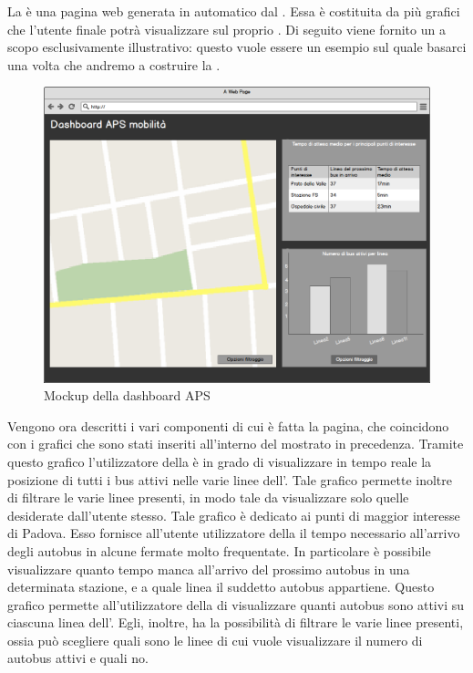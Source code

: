 	La  è una pagina web generata in automatico dal  . Essa è costituita da più grafici che l'utente finale potrà visualizzare sul proprio . Di seguito viene fornito un  a scopo esclusivamente illustrativo: questo vuole essere un esempio sul quale basarci una volta che andremo a costruire la .
	\begin{figure}[H]\centering
        \includegraphics[width=\textwidth]{SpecificaTecnica/Pics/DashboardMockup}
        \caption{Mockup della dashboard APS}
    \end{figure}
    Vengono ora descritti i vari componenti di cui è fatta la pagina, che coincidono con i grafici che sono stati inseriti all'interno del  mostrato in precedenza.
    		Tramite questo grafico l'utilizzatore della  è in grado di visualizzare in tempo reale la posizione di tutti i bus attivi nelle varie linee dell'. Tale grafico permette inoltre di filtrare le varie linee presenti, in modo tale da visualizzare solo quelle desiderate dall'utente stesso.
    		Tale grafico è dedicato ai punti di maggior interesse di Padova. Esso fornisce all'utente utilizzatore della  il tempo necessario all'arrivo degli autobus in alcune fermate  molto frequentate. In particolare è possibile visualizzare quanto tempo manca all'arrivo del prossimo autobus in una determinata stazione, e a quale linea il suddetto autobus appartiene.
    		Questo grafico permette all'utilizzatore della  di visualizzare quanti autobus sono attivi su ciascuna linea dell'. Egli, inoltre, ha la possibilità di filtrare le varie linee presenti, ossia può scegliere quali sono le linee di cui vuole visualizzare il numero di autobus attivi e quali no.
